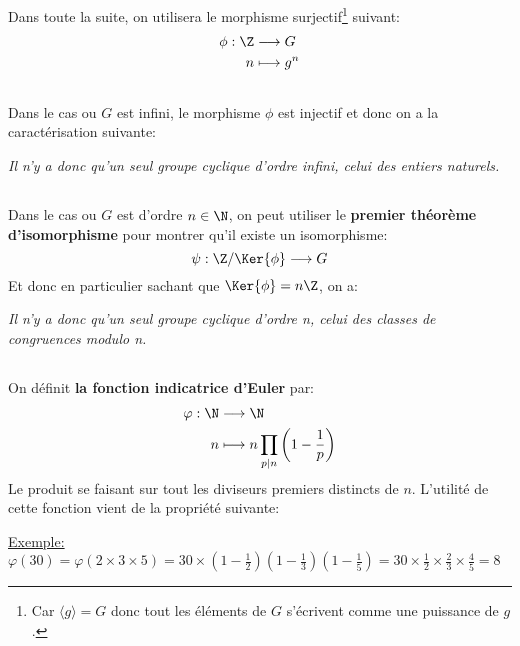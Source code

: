 Dans toute la suite, on utilisera le morphisme surjectif\footnote[1]{Car \(\langle g \rangle = G\) donc tout les éléments de \(G\) s'écrivent comme une puissance de \(g\).} suivant:
\[
   \begin{aligned}
      \phi: \Z &\longrightarrow G\\
      n &\longmapsto g^n
   \end{aligned}
\]

\subsection*{}
Dans le cas ou \(G\) est infini, le morphisme \(\phi\) est injectif et donc on a la caractérisation suivante:
\begin{center}
   \textit{Il n'y a donc qu'un seul groupe cyclique d'ordre infini, celui des entiers naturels.}
\end{center}
\subsection*{}
Dans le cas ou \(G\) est d'ordre \(n \in \N\), on peut utiliser le \textbf{premier théorème d'isomorphisme} pour montrer qu'il existe un isomorphisme:
\[
   \psi : \Z/\Ker{\phi} \longrightarrow G
\]
Et donc en particulier sachant que \(\Ker{\phi} = n\Z\), on a:
\begin{center}
   \textit{Il n'y a donc qu'un seul groupe cyclique d'ordre n, celui des classes de congruences modulo n.}
\end{center}
\subsection*{}
On définit \textbf{la fonction indicatrice d'Euler} par:
\[
   \begin{aligned}
      \varphi: \N &\longrightarrow \N\\
      n &\longmapsto n \prod_{p|n}{\left(1-\frac{1}{p}\right)}
   \end{aligned}
\]
Le produit se faisant sur tout les diviseurs premiers distincts de \(n\). L'utilité de cette fonction vient de la propriété suivante:

\underline{Exemple:} \(\varphi(30) = \varphi(2\times3\times5) = 30\times\left(1-\frac{1}{2}\right)\left(1-\frac{1}{3}\right)\left(1-\frac{1}{5}\right) = 30\times\frac{1}{2}\times\frac{2}{3}\times\frac{4}{5} = 8\)
